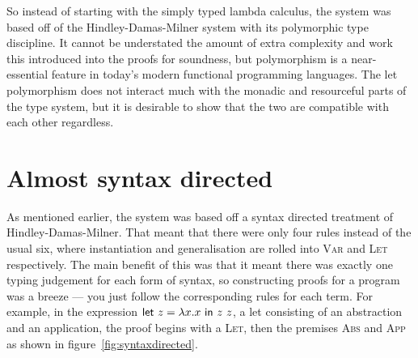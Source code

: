 So instead of starting with the simply typed lambda calculus, the
system was based off of the Hindley-Damas-Milner system with its
polymorphic type discipline. It cannot be understated the amount of
extra complexity and work this introduced into the proofs for
soundness, but polymorphism is a near-essential feature in today's
modern functional programming languages. The let polymorphism does not
interact much with the monadic and resourceful parts of the type
system, but it is desirable to show that the two are compatible with
each other regardless.

\section{Almost syntax directed}
As mentioned earlier, the system was based off a syntax directed
treatment of Hindley-Damas-Milner. That meant that there were only
four rules instead of the usual six, where instantiation and
generalisation are rolled into \textsc{Var} and \textsc{Let}
respectively. The main benefit of this was that it meant there was
exactly one typing judgement for each form of syntax, so constructing
proofs for a program was a breeze --- you just follow the corresponding rules
for each term. For example, in the expression $\mathsf{let} \ z = \lambda x . x \ \mathsf{in} \ z \
  z$, a let consisting of an abstraction and an application, the proof begins with a
\textsc{Let}, then the premises \textsc{Abs} and \textsc{App} as shown
in figure~\ref{fig:syntaxdirected}.


